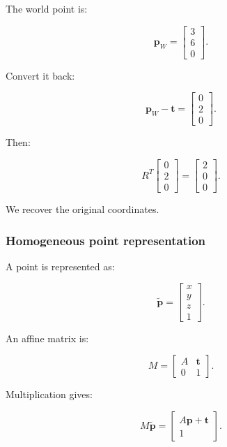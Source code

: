 The world point is:

\[
 \boxed{ \mathbf p_W= \begin{bmatrix}3\\6\\0\end{bmatrix} }.
\]

Convert it back:

\[
 \mathbf p_W-\mathbf t= \begin{bmatrix}0\\2\\0\end{bmatrix}.
\]

Then:

\[
 R^T \begin{bmatrix}0\\2\\0\end{bmatrix} = \begin{bmatrix}2\\0\\0\end{bmatrix}.
\]

We recover the original coordinates.

\subsubsection{Homogeneous point representation}\label{02-foundations-ii-ch032-homogeneous-point-representation}

\hypertarget{02-foundations-ii-ch032-homogeneous-point-representation}{}

A point is represented as:

\[
 \boxed{ \tilde{\mathbf p}= \begin{bmatrix}x\\y\\z\\1\end{bmatrix} }.
\]

An affine matrix is:

\[
 M= \begin{bmatrix} A&\mathbf t\\ 0&1 \end{bmatrix}.
\]

Multiplication gives:

\[
 M\tilde{\mathbf p}= \begin{bmatrix} A\mathbf p+\mathbf t\\1 \end{bmatrix}.
\]

